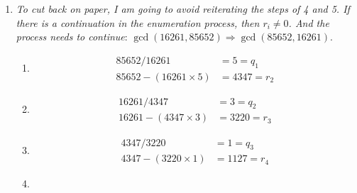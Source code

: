 {\begin{enumerate}
\begin{enumerate}[label=(\arabic*)]
                  \item \(i = 3 + 1 = 5\).
              \end{enumerate}
              \pfs
              \begin{enumerate}[label=(\arabic*)]
                  \setcounter{enumii}{2}
                  \item Divide \(r_3\) by \(r_4\) to get quotient \(q_4\) and a remainder, \(r_5\):
                        \begin{align*}
                            18 / 3            & = 6 = q_4 \\
                            18 - (3 \times 6) & = 0 = r_5
                        \end{align*}
                  \item \(r_4 = 0\). So, we stop.
              \end{enumerate}
              We have found that the greatest common divisor is \(3\).
        \item \textit{To cut back on paper, I am going to avoid reiterating the steps of 4 and 5. If there is a continuation in the enumeration process, then \(r_i \ne 0\). And the process needs to continue}: \(\gcd(16261,85652) \Rightarrow \gcd(85652,16261)\).
              \begin{enumerate}[label=(\arabic*)]
                  \item
                        \begin{align*}
                            85652 / 16261            & = 5 = q_1    \\
                            85652 - (16261 \times 5) & = 4347 = r_2
                        \end{align*}
                  \item
                        \begin{align*}
                            16261 / 4347            & = 3 = q_2    \\
                            16261 - (4347 \times 3) & = 3220 = r_3
                        \end{align*}
                  \item
                        \begin{align*}
                            4347 / 3220            & = 1 = q_3    \\
                            4347 - (3220 \times 1) & = 1127 = r_4
                        \end{align*}
                  \item

\end{enumerate}
\end{enumerate}}
